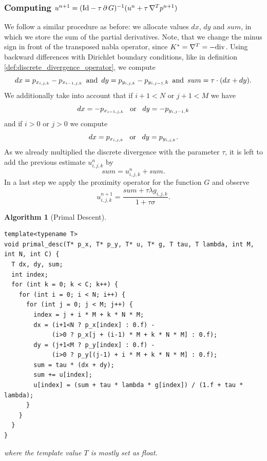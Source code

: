 \documentclass{scrreprt}
\newtheorem{algorithm}[theorem]{Algorithm}
\begin{document}
            \subsubsection{Computing $u^{n+1} = (\textnormal{Id} - \tau\,\partial\,G)^{-1}(u^{n} + \tau\,\nabla^{T}p^{n+1})$}
            \label{sub:computing_u}

                We follow a similar procedure as before: we allocate values $dx$, $dy$ and $sum$, in which we store the sum of the partial derivatives. Note, that we change the minus sign in front of the transposed nabla operator, since $K^{\ast} = \nabla^{T} = -\textnormal{div}$. Using backward differences with Dirichlet boundary conditions, like in definition \ref{def:discrete_divergence_operator}, we compute
                    $$
                        dx = p_{x_{i,j,k}} - p_{x_{i-1,j,k}} \,\,\, \textnormal{and} \,\,\, dy = p_{y_{i,j,k}} - p_{y_{i,j-1,}k} \,\,\, \textnormal{and} \,\,\, sum = \tau \cdot (dx + dy).
                    $$
                We additionally take into account that if $i + 1 < N$ or $j + 1 < M$ we have
                    $$
                        dx = -p_{x_{i-1,j,k}} \,\,\,\,\, \textnormal{or} \,\,\,\,\, dy = -p_{y_{i,j-1,}k}
                    $$
                and if $i > 0$ or $j > 0$ we compute
                    $$
                        dx = p_{x_{i,j,k}} \,\,\,\,\, \textnormal{or} \,\,\,\,\, dy = p_{y_{i,j,k}}.
                    $$
                As we already multiplied the discrete divergence with the parameter $\tau$, it is left to add the previous estimate $u_{i,j,k}^{n}$ by
                    $$
                        sum = u_{i,j,k}^{n} + sum.
                    $$
                In a last step we apply the proximity operator for the function $G$ and observe
                    $$
                        u_{i,j,k}^{n+1} = \frac{sum + \tau\lambda g_{i,j,k}}{1 + \tau\sigma}.
                    $$
                    \begin{algorithm}[Primal Descent]
                    \label{alg:primal_descent}
                        \begin{lstlisting}
template<typename T>
void primal_desc(T* p_x, T* p_y, T* u, T* g, T tau, T lambda, int M, int N, int C) {
  T dx, dy, sum;
  int index;
  for (int k = 0; k < C; k++) {
    for (int i = 0; i < N; i++) {
      for (int j = 0; j < M; j++) {
        index = j + i * M + k * N * M;
        dx = (i+1<N ? p_x[index] : 0.f) -
             (i>0 ? p_x[j + (i-1) * M + k * N * M] : 0.f);
        dy = (j+1<M ? p_y[index] : 0.f) -
             (i>0 ? p_y[(j-1) + i * M + k * N * M] : 0.f);
        sum = tau * (dx + dy);
        sum += u[index];
        u[index] = (sum + tau * lambda * g[index]) / (1.f + tau * lambda);
      }
    }
  }
}
                        \end{lstlisting}
                        where the template value $T$ is mostly set as float.
                    \end{algorithm}
\end{document}
